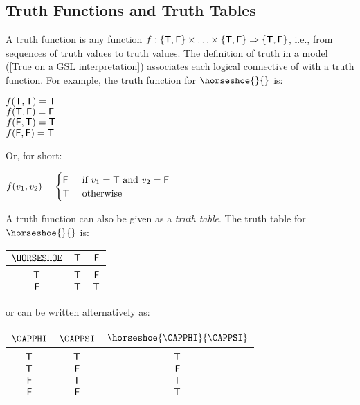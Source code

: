 \subsection{Truth Functions and Truth Tables}\label{Truth Functions Truth Tables and Boolean Operators}
A truth function is any function $f:\{\mathsf{T},\mathsf{F}\}\times\ldots\times\{\mathsf{T},\mathsf{F}\}\Rightarrow\{\mathsf{T},\mathsf{F}\}$, i.e., from sequences of truth values to truth values.  The definition of truth in a model (\ref{True on a GSL interpretation}) associates each logical connective of \GSL{} with a truth function. 
For example, the truth function for $\horseshoe{}{}$ is:
\begin{center} 
	$f(\mathsf{T},\mathsf{T})=\mathsf{T}$ \\
	$f(\mathsf{T},\mathsf{F})=\mathsf{F}$ \\
	$f(\mathsf{F},\mathsf{T})=\mathsf{T}$ \\
	$f(\mathsf{F},\mathsf{F})=\mathsf{T}$ \\
\end{center}
Or, for short:
\begin{center} 
	$f(v_1,v_2)=
	\begin{cases}
	\mathsf{F}{} & \text{ if } v_1=\mathsf{T}\text{ and }v_2=\mathsf{F} \\
	\mathsf{T}{} & \text{ otherwise}
	\end{cases}$
\end{center}
A truth function can also be given as a \emph{truth table}.
The truth table for $\horseshoe{}{}$ is:
\begin{center}
	\begin{tabular}[t]{c | c c}
		$\HORSESHOE$ & $\mathsf{T}$ & $\mathsf{F}$ \\
		\hline
		& & \\[-.25cm]
		$\mathsf{T}$ & $\mathsf{T}$ & $\mathsf{F}$ \\
		$\mathsf{F}$ & $\mathsf{T}$ & $\mathsf{T}$  
	\end{tabular}
\end{center}
or can be written alternatively as:
\begin{center}
	\begin{tabular}[t]{c c c}
		$\CAPPHI$ & $\CAPPSI$ & $\horseshoe{\CAPPHI}{\CAPPSI}$ \\
		\hline 
		& & \\[-.25cm]
		$\mathsf{T}$ & $\mathsf{T}$ & $\mathsf{T}$ \\
		$\mathsf{T}$ & $\mathsf{F}$ & $\mathsf{F}$ \\
		$\mathsf{F}$ & $\mathsf{T}$ & $\mathsf{T}$ \\
		$\mathsf{F}$ & $\mathsf{F}$ & $\mathsf{T}$ \\
	\end{tabular}
\end{center}

